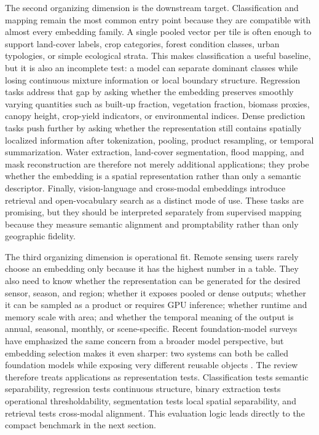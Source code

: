 The second organizing dimension is the downstream target. Classification and mapping remain the most common entry point because they are compatible with almost every embedding family. A single pooled vector per tile is often enough to support land-cover labels, crop categories, forest condition classes, urban typologies, or simple ecological strata. This makes classification a useful baseline, but it is also an incomplete test: a model can separate dominant classes while losing continuous mixture information or local boundary structure. Regression tasks address that gap by asking whether the embedding preserves smoothly varying quantities such as built-up fraction, vegetation fraction, biomass proxies, canopy height, crop-yield indicators, or environmental indices. Dense prediction tasks push further by asking whether the representation still contains spatially localized information after tokenization, pooling, product resampling, or temporal summarization. Water extraction, land-cover segmentation, flood mapping, and mask reconstruction are therefore not merely additional applications; they probe whether the embedding is a spatial representation rather than only a semantic descriptor. Finally, vision-language and cross-modal embeddings introduce retrieval and open-vocabulary search as a distinct mode of use. These tasks are promising, but they should be interpreted separately from supervised mapping because they measure semantic alignment and promptability rather than only geographic fidelity.

The third organizing dimension is operational fit. Remote sensing users rarely choose an embedding only because it has the highest number in a table. They also need to know whether the representation can be generated for the desired sensor, season, and region; whether it exposes pooled or dense outputs; whether it can be sampled as a product or requires GPU inference; whether runtime and memory scale with area; and whether the temporal meaning of the output is annual, seasonal, monthly, or scene-specific. Recent foundation-model surveys have emphasized the same concern from a broader model perspective, but embedding selection makes it even sharper: two systems can both be called foundation models while exposing very different reusable objects \citep{survey1,survey3,survey4,xiao2025foundation_survey}. The review therefore treats applications as representation tests. Classification tests semantic separability, regression tests continuous structure, binary extraction tests operational thresholdability, segmentation tests local spatial separability, and retrieval tests cross-modal alignment. This evaluation logic leads directly to the compact benchmark in the next section.
